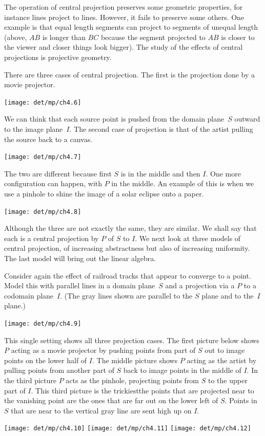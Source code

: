 The operation of  
central projection preserves some geometric 
properties, for instance lines project to lines.
However, it fails to preserve some others.
One example is that equal 
length segments can project to segments of unequal length 
(above, $AB$ is longer than $BC$ because the
segment projected to $AB$ is closer to the viewer and 
closer things look bigger).
The study of the effects of central projections is projective geometry.

There are three cases of central projection.
The first is the projection done by a movie projector.
\begin{center}
  \texttt{[image: det/mp/ch4.6]}
\end{center}
We can think that each source point is pushed from the domain plane~$S$
outward to the image plane~$I$.
The second case of projection is that of the artist
pulling the source back to a canvas.
\begin{center}
  \texttt{[image: det/mp/ch4.7]}
\end{center}
The two are different because first $S$ is in the middle
and then $I$.
One more configuration can happen, with $P$ in the middle. 
An example of this is when we use a pinhole to shine the 
image of a solar eclipse onto a paper.
\begin{center}
  \texttt{[image: det/mp/ch4.8]}
\end{center}

Although the three are not exactly the same,  
they are similar.
We shall say that 
each is a central projection by $P$ of
$S$ to $I$.
We next look at three models of central projection, 
of increasing abstractness but
also of increasing uniformity.
The last model will bring out the linear algebra.

Consider again the effect of railroad tracks  
that appear to converge to a point.
Model this with parallel lines in a domain plane~$S$
and a projection via a $P$ to a codomain plane~$I$. 
(The gray lines shown are parallel to the $S$ plane and to the~$I$ plane.)
\begin{center}
  \texttt{[image: det/mp/ch4.9]}
\end{center}
This single setting shows all three projection cases.
The first picture below shows $P$ acting as a movie projector by pushing
points from part of $S$ out to image points on the lower half of $I$.
The middle picture shows $P$ acting as the artist by 
pulling points from another part of $S$ back to  
image points in the middle of $I$.
In the third picture $P$ acts as the pinhole, projecting points from $S$
to the upper part of $I$.
This third picture is the trickiest\Dash the points that are
projected near to the vanishing point are the ones that are 
far out on the lower left of $S$. 
Points in $S$ that are near to the vertical gray line
are sent high up on $I$.
\begin{center}
  \texttt{[image: det/mp/ch4.10]}
\hfil
  \texttt{[image: det/mp/ch4.11]}
\hfil
  \texttt{[image: det/mp/ch4.12]}
\end{center}

